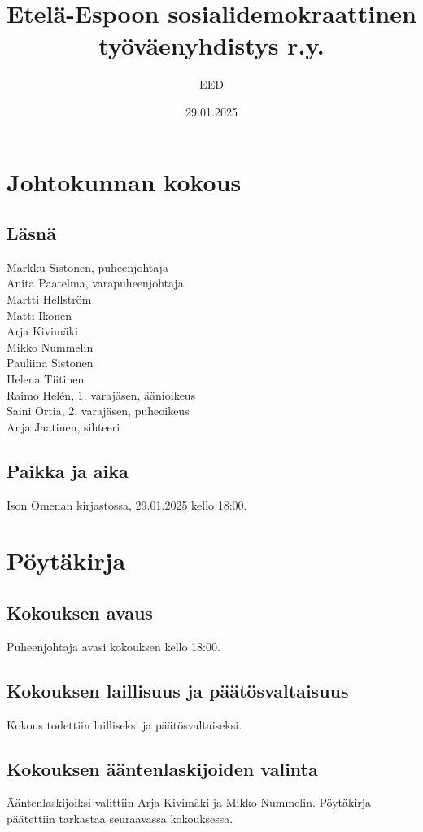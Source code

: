 \documentclass[a4paper,12pt]{article}
\title{Etelä-Espoon sosialidemokraattinen työväenyhdistys r.y.}
\author{EED}
\date{29.01.2025}
\begin{document}
\maketitle
\tableofcontents
\section*{Johtokunnan kokous}
\subsection*{Läsnä}
\begin{flushleft}
  Markku Sistonen, puheenjohtaja \\
  Anita Paatelma, varapuheenjohtaja \\
  Martti Hellström \\
  Matti Ikonen \\
  Arja Kivimäki \\
  Mikko Nummelin \\
  Pauliina Sistonen \\
  Helena Tiitinen \\
  Raimo Helén, 1. varajäsen, äänioikeus \\
  Saini Ortia, 2. varajäsen, puheoikeus \\
  Anja Jaatinen, sihteeri
\end{flushleft}
\subsection*{Paikka ja aika}
Ison Omenan kirjastossa, 29.01.2025 kello 18:00.
\section*{Pöytäkirja}
\subsection{Kokouksen avaus}
Puheenjohtaja avasi kokouksen kello 18:00.
\subsection{Kokouksen laillisuus ja päätösvaltaisuus}
Kokous todettiin lailliseksi ja päätösvaltaiseksi.
\subsection{Kokouksen ääntenlaskijoiden valinta}
Ääntenlaskijoiksi valittiin Arja Kivimäki ja Mikko Nummelin. Pöytäkirja päätettiin tarkastaa seuraavassa kokouksessa.
\end{document}
